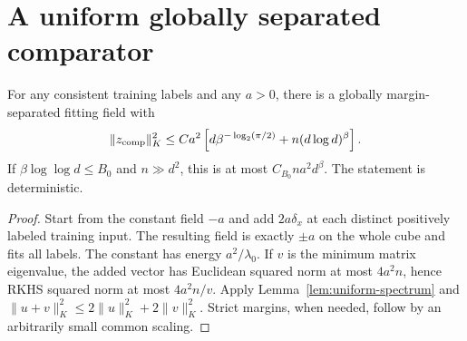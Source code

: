 \section{A uniform globally separated comparator}\label{sec:comparator}
\begin{lemma}\label{lem:comparator}
For any consistent training labels and any $a>0$, there is a globally
margin-separated fitting field with
\[
 \|z_{\rm comp}\|_K^2\le
 Ca^2\left[d\beta^{-\log_2(\pi/2)}+n(d\log d)^\beta\right].
\]
If $\beta\log\log d\le B_0$ and $n\gg d^2$, this is at most
$C_{B_0}na^2d^\beta$. The statement is deterministic.
\end{lemma}
\begin{proof}
Start from the constant field $-a$ and add $2a\delta_x$ at each distinct
positively labeled training input. The resulting field is exactly
$\pm a$ on the whole cube and fits all labels. The constant has energy
$a^2/\lambda_0$. If $v$ is the minimum matrix eigenvalue, the added
vector has Euclidean squared norm at most $4a^2n$, hence RKHS squared
norm at most $4a^2n/v$. Apply Lemma~\ref{lem:uniform-spectrum} and
$\|u+v\|_K^2\le2\|u\|_K^2+2\|v\|_K^2$. Strict margins, when needed,
follow by an arbitrarily small common scaling.
\end{proof}
